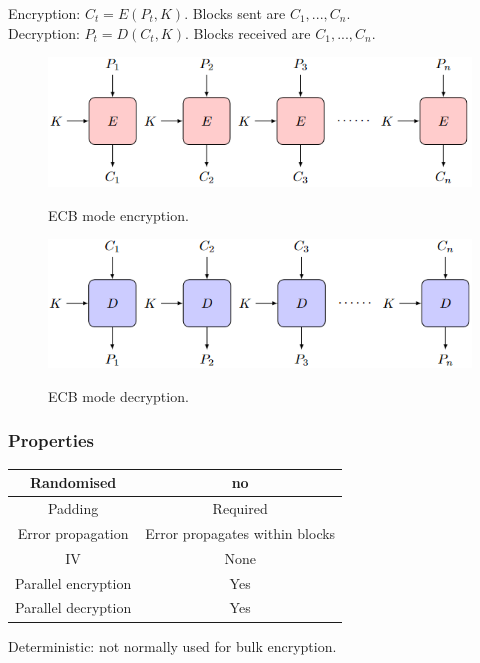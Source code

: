 \documentclass{article}
\begin{document}
Encryption: $C_t = E(P_t, K)$. Blocks sent are $C_1, ..., C_n$.\\
Decryption: $P_t = D(C_t, K)$. Blocks received are $C_1, ..., C_n$.\\
\begin{figure}[H]
\centering
\includegraphics[scale=0.75]{Images/ecbencryption.png}
\label{fig:fround}
\caption{ECB mode encryption.}
\end{figure}
\begin{figure}[H]
\centering
\includegraphics[scale=0.75]{Images/ecbdecryption.png}
\label{fig:fround}
\caption{ECB mode decryption.}
\end{figure}

\subsubsection{Properties}

\begin{center}
\begin{tabular}{ | c | c | } 
\hline
Randomised & no \\
\hline
Padding & Required \\ 
\hline
Error propagation & Error propagates within blocks \\ 
\hline
IV & None \\ 
\hline
Parallel encryption & Yes \\ 
\hline
Parallel decryption & Yes \\ 
\hline
\end{tabular}
\end{center}

Deterministic: not normally used for bulk encryption.
\end{document}
